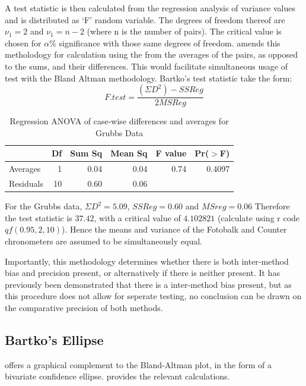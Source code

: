 \documentclass[12pt, a4paper]{article}
\begin{document}
A test statistic is then calculated from the regression analysis
of variance values \citep{BB89} and is distributed as `F' random
variable. The degrees of freedom thereof are $\nu_{1}=2$ and
$\nu_{1}=n-2$ (where n is the number of pairs). The critical value
is chosen for $\alpha\%$ significance with those same degrees of
freedom. \citet{Bartko} amends this metholodogy for calculation
using the from the averages of the pairs, as opposed to the sums,
and their differences. This would facilitate simultaneous usage of
test with the Bland Altman methodology. Bartko's test statistic
take the form:
\begin{equation} F.test = \frac{(\Sigma D^{2})-SSReg}{2MSReg}
\end{equation}

\newpage

\begin{table}[ht]
	\begin{center}
		\begin{tabular}{lrrrrr}
			\hline
			& Df & Sum Sq & Mean Sq & F value & Pr($>$F) \\
			\hline
			Averages & 1 & 0.04 & 0.04 & 0.74 & 0.4097 \\
			Residuals & 10 & 0.60 & 0.06 &  &  \\
			\hline
		\end{tabular}
		\caption{Regression ANOVA of case-wise differences and averages
			for Grubbs Data}
	\end{center}
\end{table}




For the Grubbs data, $\Sigma D^{2}=5.09 $, $SSReg = 0.60$ and
$MSreg=0.06$ Therefore the test statistic is $37.42$, with a
critical value of $4.102821$ (calculate using r code
$qf(0.95,2,10)$). Hence the means and variance of the Fotobalk and
Counter chronometers are assumed to be simultaneously equal.

Importantly, this methodology determines whether there is both
inter-method bias and precision present, or alternatively if there
is neither present. It has previously been demonstrated that there
is a inter-method bias present, but as this procedure does not
allow for seperate testing, no conclusion can be drawn on the
comparative precision of both methods.
\newpage
\subsection{Bartko's Ellipse}
\citet{Bartko} offers a graphical complement to the Bland-Altman
plot, in the form of a bivariate confidence ellipse.
\citet{AltmanEllipse} provides the relevant calculations.
\end{document}
